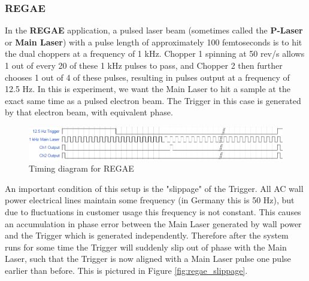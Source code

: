 \documentclass{article}
\begin{document}
    
    \subsubsection{REGAE}
    
        In the \textbf{REGAE} application, a pulsed laser beam (sometimes called the \textbf{P-Laser} or \textbf{Main Laser}) with a pulse length of approximately 100 femtoseconds is to hit the dual choppers at a frequency of 1 kHz.  Chopper 1 spinning at 50 rev/s allows 1 out of every 20 of these 1 kHz pulses to pass, and Chopper 2 then further chooses 1 out of 4 of these pulses, resulting in pulses output at a frequency of 12.5 Hz. In this is experiment, we want the Main Laser to hit a sample at the exact same time as a pulsed electron beam. The Trigger in this case is generated by that electron beam, with equivalent phase.
        
        \begin{figure}
            \includegraphics[width=1.0\textwidth]{img/regae_timing}
            \caption{Timing diagram for REGAE}
            \label{fig:regae_timing}
        \end{figure}
        
        An important condition of this setup is the "slippage" of the Trigger. All AC wall power electrical lines maintain some frequency (in Germany this is 50 Hz), but due to fluctuations in customer usage this frequency is not constant. This causes an accumulation in phase error between the Main Laser generated by wall power and the Trigger which is generated independently. Therefore after the system runs for some time the Trigger will suddenly slip out of phase with the Main Laser, such that the Trigger is now aligned with a Main Laser pulse one pulse earlier than before. This is pictured in Figure \ref{fig:regae_slippage}.
        
\end{document}
